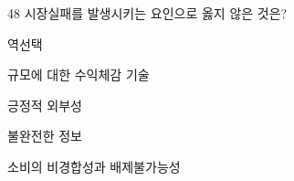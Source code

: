 \begin{question}{48}
시장실패를 발생시키는 요인으로 옳지 않은 것은?
\begin{choices}
  \item 역선택
  \item 규모에 대한 수익체감 기술
  \item 긍정적 외부성
  \item 불완전한 정보
  \item 소비의 비경합성과 배제불가능성
\end{choices}
\end{question}
